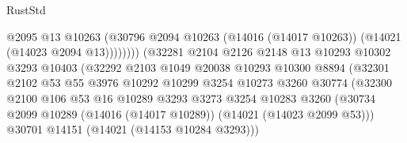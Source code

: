 \begin{lexlean}{RustStd}
\begin{coremodule}
                                            @2095
                                            @13
                                            @10263
                                            (@30796
                                              @2094
                                              @10263
                                              (@14016 (@14017 @10263))
                                              (@14021 (@14023 @2094 @13))))))))
                                  (@32281
                                    @2104
                                    @2126
                                    @2148
                                    @13
                                    @10293
                                    @10302
                                    @3293
                                    @10403
                                    (@32292
                                      @2103
                                      @1049
                                      @20038
                                      @10293
                                      @10300
                                      @8894
                                      (@32301
                                        @2102
                                        @53
                                        @55
                                        @3976
                                        @10292
                                        @10299
                                        @3254
                                        @10273
                                        @3260
                                        @30774
                                        (@32300
                                          @2100
                                          @106
                                          @53
                                          @16
                                          @10289
                                          @3293
                                          @3273
                                          @3254
                                          @10283
                                          @3260
                                          (@30734
                                            @2099
                                            @10289
                                            (@14016 (@14017 @10289))
                                            (@14021 (@14023 @2099 @53)))
                                          @30701
                                          @14151
                                          (@14021 (@14153 @10284 @3293)))

\end{coremodule}
\end{lexlean}
